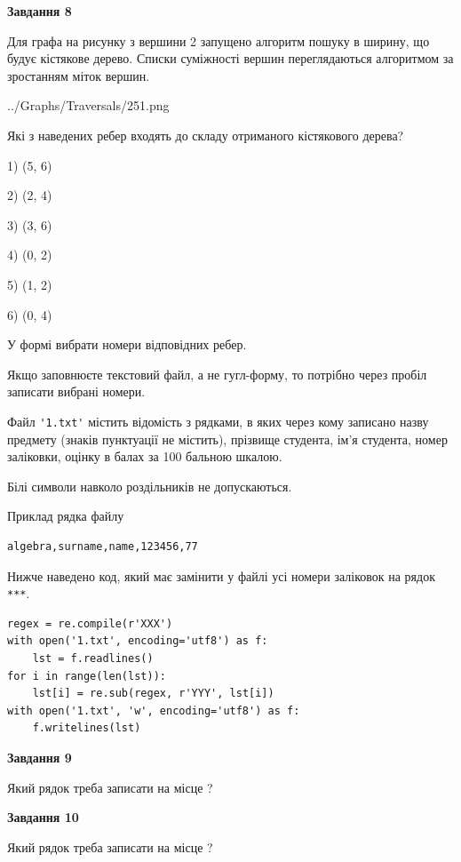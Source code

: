 \documentclass[12pt, ukrainian]{article}
\def\code#1{\Verb!#1!}
\begin{document}
{\begin {large}
{\begin {center}\textbf{Завдання 8}\end {center}}\par
Для графа на рисунку з вершини 2 запущено алгоритм пошуку в ширину, що будує кістякове дерево. Списки суміжності вершин переглядаються алгоритмом за зростанням міток вершин.\par
\begin{center}
	{../Graphs/Traversals/251.png}
\end{center}
\par Які з наведених ребер входять до складу отриманого кістякового дерева?\par
1) (5, 6)\par
2) (2, 4)\par
3) (3, 6)\par
4) (0, 2)\par
5) (1, 2)\par
6) (0, 4)\par
{\vskip 15pt} У формі вибрати номери відповідних ребер.


Якщо заповнюєте текстовий файл, а не гугл-форму, то потрібно через пробіл записа\-ти вибрані номери.\par
\newpage


Файл \code{'1.txt'} містить відомість з рядками, в яких через кому записа\-но назву предмету (знаків пунктуації не містить), прізвище студента, ім'я студента, номер залі\-ков\-ки, оцінку в балах за 100 бальною шкалою.

Білі символи навколо роздільників не допускаються.

Приклад рядка файлу



\begin{verbatim}
algebra,surname,name,123456,77
\end{verbatim}


Нижче наведено код, який має замінити у файлі усі номери заліковок на рядок \code{***}.



\begin{verbatim}
regex = re.compile(r'XXX')
with open('1.txt', encoding='utf8') as f:
    lst = f.readlines()
for i in range(len(lst)):
    lst[i] = re.sub(regex, r'YYY', lst[i])
with open('1.txt', 'w', encoding='utf8') as f:
    f.writelines(lst)
\end{verbatim}




{\begin {center}\textbf{Завдання 9}\end {center}}\par
Який рядок треба записати на місце  ?\par
\vspace{5mm}


{\begin {center}\textbf{Завдання 10}\end {center}}\par
Який рядок треба записати на місце  ?\par


\newpage


\end {large}}
\end{document}
